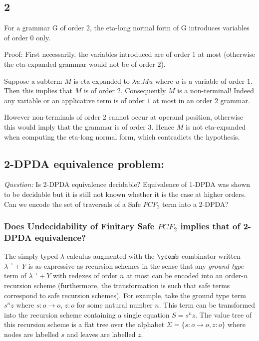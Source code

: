 \documentclass{article}
\begin{document}
\subsection{2}

For a grammar G of order 2, the eta-long normal form of G introduces variables
of order 0 only.

Proof: First necessarily, the variables introduced are of order 1 at most
(otherwise the eta-expanded grammar would not be of order 2).

Suppose a subterm $M$ is eta-expanded to $\lambda u . M u$ where $u$ is a variable
of order $1$. Then this implies that $M$ is of order $2$. Consequently $M$ is a non-terminal!
Indeed any variable or an applicative term is of order $1$ at most in an order $2$ grammar.

However non-terminals of order $2$ cannot occur at operand position, otherwise this would imply that
the grammar is of order $3$. Hence $M$ is not eta-expanded when computing the eta-long normal form, which contradicts the hypothesis.


\subsection{2-DPDA equivalence problem:}

\emph{Question:} Is 2-DPDA equivalence decidable?
Equivalence of 1-DPDA was shown to be decidable but it is still not known
whether it is the case at higher orders.
Can we encode the set of traversals of a Safe $PCF_2$ term into a 2-DPDA?

\subsubsection{Does Undecidability of Finitary Safe $PCF_2$ implies
that of 2-DPDA equivalence?}

The simply-typed $\lambda$-calculus augmented with the
$\ycomb$-combinator written $\lambda^\rightarrow + Y$ is as expressive as
recursion schemes in the sense that any \emph{ground type} term of
$\lambda^\rightarrow + Y$ with redexes of order $n$ at most can be
encoded into an order-$n$ recursion scheme (furthermore, the
transformation is such that safe terms correspond to safe recursion
schemes). For example, take the ground type term $s^n z$ where
$s:o\rightarrow o$, $z :o$ for some natural number $n$. This term
can be transformed into the recursion scheme containing a single
equation $S = s^n z$. The value tree of this recursion scheme is a
flat tree over the alphabet $\Sigma = \{s:o\rightarrow o, z:o\}$
where nodes are labelled $s$ and leaves are labelled $z$.
\end{document}
